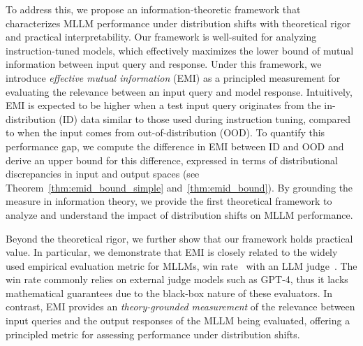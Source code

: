 To address this, we propose an information-theoretic framework that characterizes MLLM performance under distribution shifts with theoretical rigor and practical interpretability. Our framework is well-suited for analyzing instruction-tuned models, which effectively maximizes the lower bound of mutual information between input query and response. Under this framework, 
we introduce \emph{effective mutual information} (EMI) as a principled measurement for evaluating the relevance between an input query and model response. Intuitively, EMI is expected to be higher when a test input query originates from the in-distribution (ID) data similar to those used during instruction tuning, compared to when the input comes from out-of-distribution (OOD). To quantify this performance gap, we compute the difference in EMI between ID and OOD and derive an upper bound for this difference, expressed in terms of distributional discrepancies in input and output spaces (see Theorem~\ref{thm:emid_bound_simple} and~\ref{thm:emid_bound}). By grounding the measure in information theory, we provide the first theoretical framework to analyze and understand the impact of distribution shifts on MLLM performance.


Beyond the theoretical rigor, we further show that our framework holds practical value. In particular, we demonstrate that EMI is closely related to the widely used empirical evaluation metric for MLLMs, win rate~\cite{ouyang2022training} with an LLM judge~\cite{zheng2023judging}. The win rate commonly relies on external judge models such as GPT-4, thus it lacks mathematical guarantees due to the black-box nature of these evaluators. In contrast, EMI provides an \emph{theory-grounded measurement} of the relevance between input queries and the output responses of the MLLM being evaluated, offering a principled metric for assessing performance under distribution shifts.

